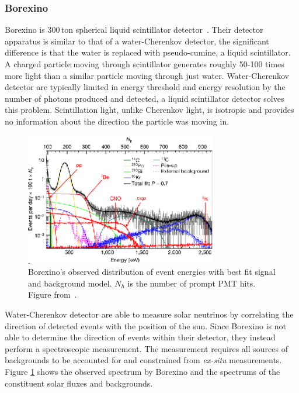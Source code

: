 \subsubsection{Borexino}
Borexino is 300\,ton spherical liquid scintillator detector~\cite{borexino_tdr}. Their detector
apparatus is similar to that of a water-Cherenkov detector, the significant difference
is that the water is replaced with pseudo-cumine, a liquid scintillator.
A charged particle moving through scintillator generates roughly 50-100 times
more light than a similar particle moving through just water.
Water-Cherenkov detector are typically limited in energy threshold
and energy resolution by the number of photons produced and detected, a liquid scintillator
detector solves this problem.  Scintillation light, unlike Cherenkov light,
is isotropic and provides no information about the direction the particle
was moving in.
\begin{figure}[htbp]
    \centering
    \includegraphics[width=0.75\textwidth]{borexino_spectrum}
    \caption[Borexino Spectrum] {Borexino's observed distribution of event energies with best fit
    signal and background model.
    $N_{h}$ is the number of prompt PMT hits.  Figure from~\cite{borexino_nature}.} %
\label{fig:borexino_spectrum}
\end{figure}

Water-Cherenkov detector are able to measure solar neutrinos by correlating the
direction of detected events with the position of the sun. Since Borexino is not
able to determine the direction of events within their detector, they instead
perform a spectroscopic measurement. The measurement requires
all sources of backgrounds to be accounted for and constrained from \textit{ex-situ}
measurements. Figure \ref{fig:borexino_spectrum} shows the observed spectrum by Borexino and the
spectrums of the constituent solar fluxes and backgrounds.

